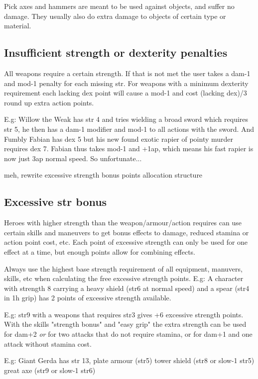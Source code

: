 Pick axes and hammers are meant to be used against objects, and suffer no damage. They usually also do extra damage to objects of certain type or material.


\subsection*{Insufficient strength or dexterity penalties}
All weapons require a certain strength. If that is not met the user takes a dam-1 and mod-1 penalty for each missing str. For weapons with a minimum dexterity requirement each lacking dex point will cause a mod-1 and cost (lacking dex)/3 round up extra action points.

E.g: Willow the Weak has str 4 and tries wielding a broad sword which requires str 5, he then has a dam-1 modifier and mod-1 to all actions with the sword.
And Fumbly Fabian has dex 5 but his new found exotic rapier of pointy murder requires dex 7. Fabian thus takes mod-1 and +1ap, which means his fast rapier is now just 3ap normal speed. So unfortunate...


\vspace{10mm}
\TODO meh, rewrite excessive strength bonus points allocation structure
\subsection*{Excessive str bonus}
Heroes with higher strength than the weapon/armour/action requires can use certain skills and maneuvers to get bonus effects to damage, reduced stamina or action point cost, etc. Each point of excessive strength can only be used for one effect at a time, but enough points allow for combining effects.

Always use the highest base strength requirement of all equipment, manuvers, skills, etc when calculating the free excessive strength points.
E.g: A character with strength 8 carrying a heavy shield (str6 at normal speed) and a spear (str4 in 1h grip) has 2 points of excessive strength available.

E.g: str9 with a weapons that requires str3 gives +6 excessive strength points. With the skills "strength bonus" and "easy grip" the extra strength can be used for dam+2 \emph{or} for two attacks that do not require stamina, or for dam+1 and one attack without stamina cost.

E.g: Giant Gerda has str 13, 
plate armour (str5)
tower shield (str8 or slow-1 str5)
great axe (str9 or slow-1 str6)


